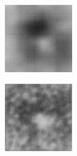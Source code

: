\begin{figure}[H]
\begin{subfigure}[t]{0.15\textwidth}
  \end{subfigure}
  \begin{subfigure}[t]{0.15\textwidth}
    \centering
    \includegraphics[width=\linewidth]{img/ten-trials/prediction_1_cnnv2.png}
  \end{subfigure}
  \begin{subfigure}[t]{0.15\textwidth}
    \centering
    \includegraphics[width=\linewidth]{img/ten-trials/prediction_1_cnnv3.png}

\end{subfigure}
\end{figure}
